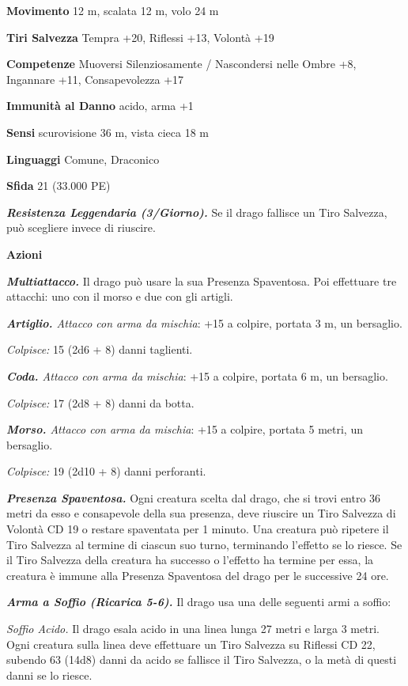 \begin{multicols}{2}
\textbf{Movimento} 12 m, scalata 12 m, volo 24 m

\textbf{Tiri Salvezza} Tempra +20, Riflessi +13, Volontà +19

\textbf{Competenze} Muoversi Silenziosamente / Nascondersi nelle Ombre +8, Ingannare +11, Consapevolezza +17

\textbf{Immunità al Danno} acido, arma +1

\textbf{Sensi} scurovisione 36 m, vista cieca 18 m

\textbf{Linguaggi} Comune, Draconico

\textbf{Sfida} 21 (33.000 PE)

\emph{\textbf{Resistenza Leggendaria (3/Giorno).}} Se il drago fallisce un Tiro Salvezza, può scegliere invece di riuscire.

\textbf{Azioni}

\emph{\textbf{Multiattacco.}} Il drago può usare la sua Presenza Spaventosa. Poi effettuare tre attacchi: uno con il morso e due con gli artigli.

\emph{\textbf{Artiglio.} Attacco con arma da mischia}: +15 a colpire, portata 3 m, un bersaglio.

\emph{Colpisce:} 15 (2d6 + 8) danni taglienti.

\emph{\textbf{Coda.} Attacco con arma da mischia}: +15 a colpire, portata 6 m, un bersaglio.

\emph{Colpisce:} 17 (2d8 + 8) danni da botta.

\emph{\textbf{Morso.} Attacco con arma da mischia}: +15 a colpire, portata 5 metri, un bersaglio.

\emph{Colpisce:} 19 (2d10 + 8) danni perforanti.

\emph{\textbf{Presenza Spaventosa.}} Ogni creatura scelta dal drago, che si trovi entro 36 metri da esso e consapevole della sua presenza, deve riuscire un Tiro Salvezza di Volontà CD 19 o restare spaventata per 1 minuto. Una creatura può ripetere il Tiro Salvezza al termine di ciascun suo turno, terminando l'effetto se lo riesce. Se il Tiro Salvezza della creatura ha successo o l'effetto ha termine per essa, la creatura è immune alla Presenza Spaventosa del drago per le successive 24 ore.

\emph{\textbf{Arma a Soffio (Ricarica 5-6).}} Il drago usa una delle seguenti armi a soffio:

\emph{Soffio Acido.} Il drago esala acido in una linea lunga 27 metri e larga 3 metri. Ogni creatura sulla linea deve effettuare un Tiro Salvezza su Riflessi CD 22, subendo 63 (14d8) danni da acido se fallisce il Tiro Salvezza, o la metà di questi danni se lo riesce.


\end{multicols}
